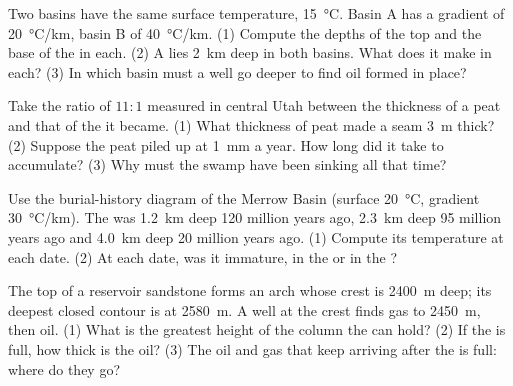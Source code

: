 \begin{exercise}[$\star\star$]\label{exo:g11:fossil-fuel-geology:6}
Two basins have the same surface temperature, \qty{15}{\degreeCelsius}.
Basin A has a gradient of \qty{20}{\degreeCelsius/km}, basin B of
\qty{40}{\degreeCelsius/km}. (1) Compute the depths of the top and the base
of the  in each. (2) A  lies \qty{2}{km} deep in both
basins. What does it make in each? (3) In which basin must a well go deeper
to find oil formed in place?
\end{exercise}

\begin{exercise}[$\star\star$]\label{exo:g11:fossil-fuel-geology:7}
Take the ratio of $11{:}1$ measured in central Utah between the thickness of a
peat and that of the  it became. (1) What thickness of peat made a 
seam \qty{3}{m} thick? (2) Suppose the peat piled up at \qty{1}{mm} a year.
How long did it take to accumulate? (3) Why must the swamp have been sinking
all that time?
\end{exercise}

\begin{exercise}[$\star\star$]\label{exo:g11:fossil-fuel-geology:8}
Use the burial-history diagram of the Merrow Basin (surface
\qty{20}{\degreeCelsius}, gradient \qty{30}{\degreeCelsius/km}). The  was \qty{1.2}{km} deep 120 million years ago, \qty{2.3}{km} deep 95
million years ago and \qty{4.0}{km} deep 20 million years ago. (1) Compute
its temperature at each date. (2) At each date, was it immature, in the  or in the ?
\end{exercise}

\begin{exercise}[$\star\star$]\label{exo:g11:fossil-fuel-geology:9}
The top of a reservoir sandstone forms an arch whose crest is \qty{2400}{m}
deep; its deepest closed contour is at \qty{2580}{m}. A well at the crest
finds gas to \qty{2450}{m}, then oil. (1) What is the greatest height of the
column the  can hold? (2) If the  is full, how thick is the oil?
(3) The oil and gas that keep arriving after the  is full: where do they
go?
\end{exercise}

